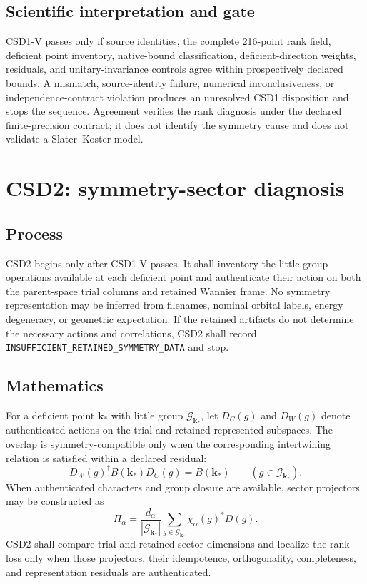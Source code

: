 \documentclass[11pt]{report}
\begin{document}
\section{Scientific interpretation and gate}

CSD1-V passes only if source identities, the complete 216-point rank field, deficient
point inventory, native-bound classification, deficient-direction weights, residuals,
and unitary-invariance controls agree within prospectively declared bounds.  A mismatch,
source-identity failure, numerical inconclusiveness, or independence-contract violation
produces an unresolved CSD1 disposition and stops the sequence.  Agreement verifies the
rank diagnosis under the declared finite-precision contract; it does not identify the
symmetry cause and does not validate a Slater--Koster model.

\chapter{CSD2: symmetry-sector diagnosis}

\section{Process}

CSD2 begins only after CSD1-V passes.  It shall inventory the little-group operations
available at each deficient point and authenticate their action on both the parent-space
trial columns and retained Wannier frame.  No symmetry representation may be inferred
from filenames, nominal orbital labels, energy degeneracy, or geometric expectation.  If
the retained artifacts do not determine the necessary actions and correlations, CSD2
shall record \texttt{INSUFFICIENT\_RETAINED\_SYMMETRY\_DATA} and stop.

\section{Mathematics}

For a deficient point $\mathbf{k}_*$ with little group
$\mathcal{G}_{\mathbf{k}_*}$, let $D_C(g)$ and $D_W(g)$ denote authenticated actions on
the trial and retained represented subspaces.  The overlap is symmetry-compatible only
when the corresponding intertwining relation is satisfied within a declared residual:
\begin{equation}
 D_W(g)^{\dagger}B(\mathbf{k}_*)D_C(g)=B(\mathbf{k}_*)
 \qquad (g\in\mathcal{G}_{\mathbf{k}_*}).
 \label{eq:csd2-intertwiner}
\end{equation}
When authenticated characters and group closure are available, sector projectors may be
constructed as
\begin{equation}
 \Pi_{\alpha}=\frac{d_{\alpha}}{|\mathcal{G}_{\mathbf{k}_*}|}
 \sum_{g\in\mathcal{G}_{\mathbf{k}_*}}
 \chi_{\alpha}(g)^*D(g).
\end{equation}
CSD2 shall compare trial and retained sector dimensions and localize the rank loss only
when those projectors, their idempotence, orthogonality, completeness, and representation
residuals are authenticated.
\end{document}
